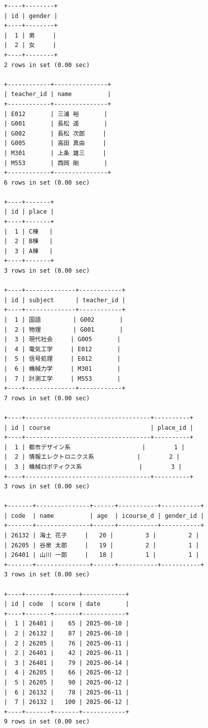 \documentclass[a4paper,11pt]{ltjsarticle}
\begin{document}
\begin{lstlisting}[caption={SQL実行結果}, label={lst:sql_result}]
+----+--------+
| id | gender |
+----+--------+
|  1 | 男     |
|  2 | 女     |
+----+--------+
2 rows in set (0.00 sec)

+------------+---------------+
| teacher_id | name          |
+------------+---------------+
| E012       | 三浦 裕       |
| G001       | 長松 遥       |
| G002       | 長松 次郎     |
| G005       | 高田 真由     |
| M301       | 上条 雄三     |
| M553       | 西岡 剛       |
+------------+---------------+
6 rows in set (0.00 sec)

+----+-------+
| id | place |
+----+-------+
|  1 | C棟   |
|  2 | B棟   |
|  3 | A棟   |
+----+-------+
3 rows in set (0.00 sec)

+----+--------------+------------+
| id | subject      | teacher_id |
+----+--------------+------------+
|  1 | 国語         | G002       |
|  2 | 物理         | G001       |
|  3 | 現代社会     | G005       |
|  4 | 電気工学     | E012       |
|  5 | 信号処理     | E012       |
|  6 | 機械力学     | M301       |
|  7 | 計測工学     | M553       |
+----+--------------+------------+
7 rows in set (0.00 sec)

+----+-----------------------------------+----------+
| id | course                            | place_id |
+----+-----------------------------------+----------+
|  1 | 都市デザイン系                    |        1 |
|  2 | 情報エレクトロニクス系            |        2 |
|  3 | 機械ロボティクス系                |        3 |
+----+-----------------------------------+----------+
3 rows in set (0.00 sec)

+-------+---------------+------+-----------+-----------+
| code  | name          | age  | icourse_d | gender_id |
+-------+---------------+------+-----------+-----------+
| 26132 | 海土 花子     |   20 |         3 |         2 |
| 26205 | 谷泉 太郎     |   19 |         2 |         1 |
| 26401 | 山川 一郎     |   18 |         1 |         1 |
+-------+---------------+------+-----------+-----------+
3 rows in set (0.00 sec)

+----+-------+-------+------------+
| id | code  | score | date       |
+----+-------+-------+------------+
|  1 | 26401 |    65 | 2025-06-10 |
|  2 | 26132 |    87 | 2025-06-10 |
|  2 | 26205 |    76 | 2025-06-11 |
|  2 | 26401 |    42 | 2025-06-11 |
|  3 | 26401 |    79 | 2025-06-14 |
|  4 | 26205 |    66 | 2025-06-12 |
|  5 | 26205 |    90 | 2025-06-12 |
|  6 | 26132 |    78 | 2025-06-11 |
|  7 | 26132 |   100 | 2025-06-12 |
+----+-------+-------+------------+
9 rows in set (0.00 sec)
\end{lstlisting}
\end{document}
